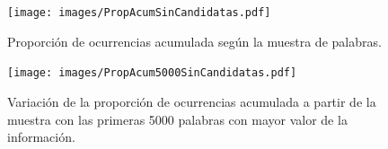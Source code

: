 \begin{figure}\centering
    \texttt{[image: images/PropAcumSinCandidatas.pdf]}
    \caption{Proporción de ocurrencias acumulada según la muestra de palabras.} 
    \label{fig:propAcum} 
\end{figure}


\begin{figure}\centering
    \texttt{[image: images/PropAcum5000SinCandidatas.pdf]}
    \caption{Variación de la proporción de ocurrencias acumulada a partir de la muestra con las primeras 5000 palabras con mayor valor de la información.} 
    \label{fig:propAcum5000} 
\end{figure}

